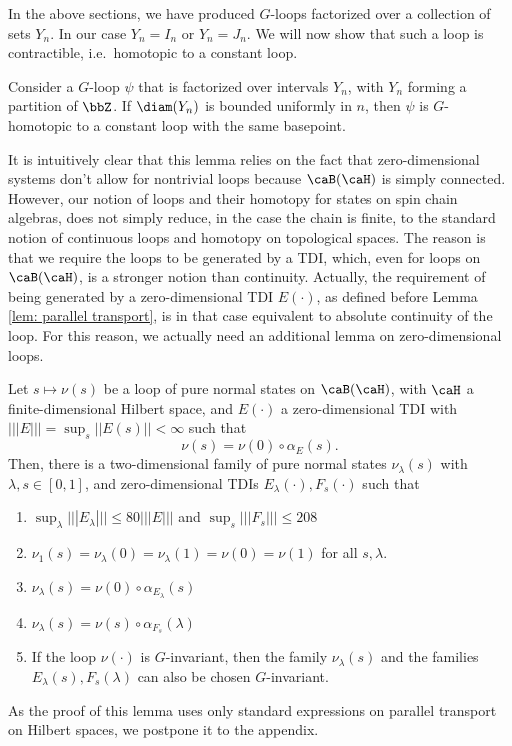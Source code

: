 In the above sections, we have produced $G$-loops factorized over a collection of sets $Y_n$. In our case $Y_n=I_n$ or $Y_n=J_n$.
We will now show that such a loop is contractible, i.e.\ homotopic to a constant loop.  
\begin{lemma}\label{lem: contractibility of product loop}
	Consider a $G$-loop $\psi$ that is factorized over intervals $Y_n$, with $Y_n$ forming a partition of $\bbZ$. If $\diam(Y_n)$ is bounded uniformly in $n$, then $\psi$ is $G$-homotopic to a constant loop with the same basepoint. 
\end{lemma}
It is intuitively clear that this lemma relies on the fact that zero-dimensional systems don't allow for nontrivial loops because $\caB(\caH)$ is simply connected.  However, our notion of loops and their homotopy for states on spin chain algebras, does not simply reduce, in the case the chain is finite, to the standard notion of continuous loops and homotopy on topological spaces.  The reason is that we require the loops to be generated by a TDI, which, even for loops on $\caB(\caH)$, is a stronger notion than continuity. Actually, the requirement of being generated by a zero-dimensional TDI  $E(\cdot)$, as defined before Lemma \ref{lem: parallel transport}, is in that case equivalent to absolute continuity of the loop. 
For this reason, we actually need an additional lemma on zero-dimensional loops.
\begin{lemma}\label{lem: contractibility zero dim} Let $s\mapsto\nu(s)$ be a loop of pure normal states on $\caB(\caH)$, with $\caH$ a finite-dimensional Hilbert space, 
	and  $E(\cdot)$ a zero-dimensional TDI with $ |||E|||= \sup_s||E(s)|| <\infty$ such that 
	$$ \nu(s)=  \nu(0) \circ  \alpha_E(s).$$
	Then, there is a two-dimensional family of pure normal states $\nu_{\lambda}(s)$ with $\lambda, s \in [0,1]$, and zero-dimensional TDIs $E_\lambda(\cdot),F_s(\cdot)$ such that 
	\begin{enumerate}
		\item $\sup_\lambda|||E_\lambda||| \leq  80|||E||| $ and  $\sup_s |||F_s||| \leq  208 $
		\item $\nu_1(s)=\nu_{\lambda}(0)=\nu_{\lambda}(1)=\nu(0)=\nu(1)$ for all $s,\lambda$. 
		\item  $\nu_{\lambda}(s) =  \nu(0) \circ  \alpha_{E_\lambda}(s)  $
		\item  $\nu_{\lambda}(s)  = \nu(s) \circ  \alpha_{F_s}(\lambda)   $
		\item If the loop $\nu(\cdot)$ is $G$-invariant, then the family $\nu_\lambda(s)$ and the families $E_\lambda(s),F_s(\lambda)$ can also be chosen $G$-invariant. 
	\end{enumerate}
\end{lemma}
As the proof of this lemma uses only standard expressions on parallel transport on Hilbert spaces, we postpone it to the appendix.



